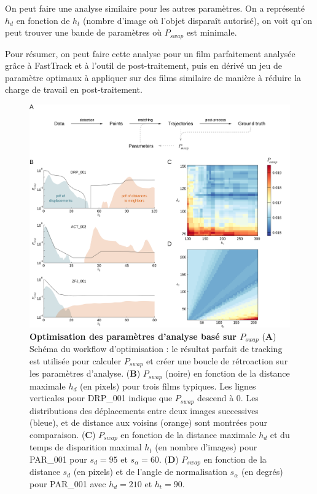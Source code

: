 	On peut faire une analyse similaire pour les autres paramètres. On a représenté $h_d$ en fonction de $h_t$ (nombre d'image où l'objet disparaît autorisé), on voit qu'on peut trouver une bande de paramètres où $P_{swap}$ est minimale.
	
	Pour résumer, on peut faire cette analyse pour un film parfaitement analysée grâce à FastTrack et à l'outil de post-traitement, puis en dérivé un jeu de paramètre optimaux à appliquer sur des films similaire de manière à réduire la charge de travail en post-traitement.\\
	
	\begin{figure}[h]
    \centering
    \includegraphics[width=1\textwidth]{part_1/assets/Figure_4.png}    
    \caption{\textbf{Optimisation des paramètres d'analyse basé sur $P_{swap}$} (\textbf{A}) Schéma du workflow d'optimisation : le résultat parfait de tracking est utilisée pour calculer $P_{swap}$ et créer une boucle de rétroaction sur les paramètres d'analyse. (\textbf{B}) $P_{swap}$ (noire) en fonction de la distance maximale $h_d$ (en pixels) pour trois films typiques. Les lignes verticales pour DRP\_001 indique que $P_{swap}$ descend à 0. Les distributions des déplacements entre deux images successives (bleue), et de distance aux voisins (orange) sont montrées pour comparaison. (\textbf{C}) $P_{swap}$ en fonction de la distance maximale $h_d$ et du temps de disparition maximal $h_t$ (en nombre d'images) pour PAR\_001 pour $s_d=95$ et $s_{\alpha}=60$. (\textbf{D}) $P_{swap}$ en fonction de la distance $s_d$ (en pixels) et de l'angle de normalisation $s_{\alpha}$ (en degrés) pour PAR\_001 avec $h_d=210$ et $h_t=90$. } 
    \label{part_1:fig_4}
    \end{figure}
	
